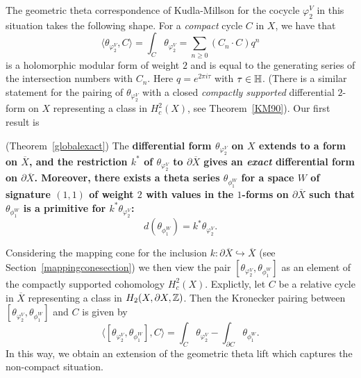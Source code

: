The geometric theta correspondence of Kudla-Millson \cite{KM90} for
the cocycle $\varphi^V_{2}$ in this situation takes the following
shape. For a {\it compact} cycle $C$ in $X$, we have that
\begin{equation}\label{KM-id}
\langle \theta_{\varphi^V_{2}}, C \rangle =  \int_C  \theta_{\varphi^V_{2}}= \sum_{n \geq 0} (C_n \cdot C) q^n
\end{equation}
is a holomorphic modular form of weight $2$ and is equal to the
generating series of the  intersection numbers with $C_n$. Here $q
= e^{2\pi i \tau}$ with $\tau \in \mathbb{H}$.
(There is a similar statement for the pairing of $\theta_{\varphi^V_{2}}$
with a closed {\it compactly supported} differential $2$-form on
${X}$ representing a class in $H^2_c(X)$, see Theorem~\ref{KM90}).
Our first result is

\begin{theorem}\label{FM-boundaryexact}  (Theorem~\ref{globalexact})
The \bf{differential form} $\theta_{\varphi^V_{2}}$ on $X$ extends
to a form on $\overline{X}$, and the restriction $k^{\ast}$ of
$\theta_{\varphi^V_{2}}$ to $\partial \overline{X}$ gives an {\it
exact} differential form on $\partial\overline{X}$. Moreover, there
exists a theta series $\theta_{\phi_1^W}$ for a space $W$ of signature
$(1,1)$  of weight $2$ with values in the $1$-forms on $\partial
\overline{X}$ such that $\theta_{\phi_1^W}$ is a primitive for
$k^{\ast} \theta_{\varphi^V_{2}}$:
\[
d (\theta_{\phi_1^W}) = k^{\ast} \theta_{\varphi^V_{2}}.
\]
\end{theorem}

Considering the mapping cone for the inclusion $k: \partial
\overline{X} \hookrightarrow \overline{X}$ (see
Section~\ref{mappingconesection}) we then view the pair
$[\theta_{\varphi^V_{2}}, \theta_{\phi_1^W}]$ as an element of the
compactly supported cohomology $H^2_c(X)$. Explictly, let $C$ be a
relative cycle in $\overline{X}$ representing a class in $H_2({X},\partial
{X},\mathbb{Z})$. Then the Kronecker pairing between $[\theta_{\varphi^V_{2}},
\theta_{\phi_1^W}]$ and $C$ is given by
\begin{equation}\label{mappingconelift}
\langle [\theta_{\varphi^V_{2}}, \theta_{\phi_1^W}], C \rangle = \int_C  \theta_{\varphi^V_{2}}
 - \int_{\partial C} \theta_{\phi_1^W}.
\end{equation}
In this way, we obtain an extension of the geometric theta lift
which captures the non-compact situation.

